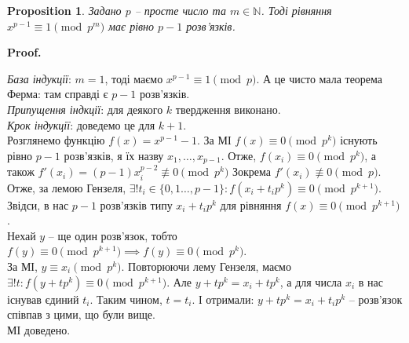 \documentclass[a4paper, 14pt]{extarticle}
\makeatletter
\theoremstyle{theoremdd}
\theoremstyle{theoremdd}
\theoremstyle{theoremdd}
\theoremstyle{theoremdd}
\theoremstyle{theoremdd}
\newtheorem{proposition}[theorem]{Proposition}
\theoremstyle{theoremdd}
\theoremstyle{theoremdd}
\theoremstyle{theoremdd}
\def\qed{$\blacksquare$}
\renewenvironment{proof}[1][Proof.\\]{\par
\pushQED{\hfill \qed}%
\normalfont \topsep6\p@\@plus6\p@\relax
\trivlist
\item\relax
{\bfseries
#1\@addpunct{.}}\hspace\labelsep\ignorespaces
}{%
\popQED\endtrivlist\@endpefalse
}
\makeatother
\begin{document}
\begin{proposition}
Задано $p$ -- просте число та $m \in \mathbb{N}$. Тоді рівняння $x^{p-1} \equiv 1 \pmod {p^m}$ має рівно $p-1$ розв'язків.
\end{proposition}

\begin{proof}
\textit{База індукції}: $m = 1$, тоді маємо $x^{p-1} \equiv 1 \pmod p$. А це чисто мала теорема Ферма: там справді є $p-1$ розв'язків.\\
\textit{Припущення індкції}: для деякого $k$ твердження виконано.\\
\textit{Крок індукції}: доведемо це для $k+1$.\\
Розглянемо функцію $f(x) = x^{p-1} - 1$. За МІ $f(x) \equiv 0 \pmod {p^k}$ існують рівно $p-1$ розв'язків, я їх назву $x_1,\dots,x_{p-1}$. Отже, $f(x_i) \equiv 0 \pmod {p^k}$, а також $f'(x_i) = (p-1)x_i^{p-2} \not\equiv 0 \pmod {p^k}$ Зокрема $f'(x_i) \not\equiv 0 \pmod p$.\\
Отже, за лемою Гензеля, $\exists! t_i \in \{0,1\dots,p-1\}: f(x_i+t_i p^k) \equiv 0 \pmod {p^{k+1}}$.\\
Звідси, в нас $p-1$ розв'язків типу $x_i+t_ip^k$ для рівняння $f(x) \equiv 0 \pmod {p^{k+1}}$.\\
Нехай $y$ -- ще один розв'язок, тобто \\
$f(y) \equiv 0 \pmod {p^{k+1}} \implies f(y) \equiv 0 \pmod {p^k}$. \\
За МІ, $y \equiv x_i \pmod {p^k}$. Повторюючи лему Гензеля, маємо $\exists !t: f(y+tp^k) \equiv 0 \pmod {p^{k+1}}$. Але $y+tp^k = x_i+tp^k$, а для числа $x_i$ в нас існував єдиний $t_i$. Таким чином, $t = t_i$. І отримали: $y + tp^k = x_i + t_ip^k$ -- розв'язок співпав з цими, що були вище.\\
МІ доведено.
\end{proof}
\end{document}
